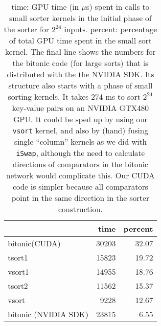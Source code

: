 

\begin{table}
\begin{center}
  \begin{tabular}{| l | r | r |   }

    \hline
                              & time & percent \\ \hline
    bitonic(CUDA)             & 30203 & 32.07\\
    tsort1                    & 15823 & 19.72  \\
    vsort1                       & 14955 & 18.76 \\ 
    tsort2                      & 11562 & 15.37    \\ 
    vsort                       & 9228 &  12.67 \\ 
    bitonic (NVIDIA SDK)        & 23815 & 6.55 \\
    \hline
  \end{tabular}
\end{center}
\label{tab:table2}
\caption{time: GPU time (in $\mu$s) spent in calls to small sorter kernels 
in the initial phase of the sorter for $2^{24}$ inputs. percent: percentage 
of total GPU time spent in the small sort kernel.
The final line shows the numbers for the bitonic code (for large sorts) that 
is distributed with the the NVIDIA SDK. Its structure also starts with a phase 
of small sorting kernels. It takes 274 ms to sort $2^{24}$ key-value pairs on 
an NVIDIA GTX480 GPU. It could be sped up by using our {\tt vsort} kernel, 
and also by (hand) fusing single ``column'' kernels as we did with {\tt iSwap}, 
although the need to calculate directions of comparators in the bitonic network 
would complicate this. Our CUDA code is simpler because all comparators
point in the same direction in the sorter construction.
} 
\end{table}







